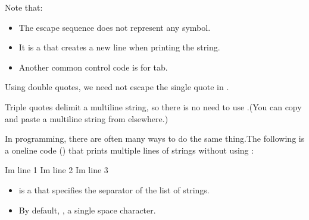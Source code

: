 \documentclass[letterpaper,10pt,english]{sphinxmanual}
\begin{document}
Note that:
\begin{itemize}
\item {} 
The escape sequence  does not represent any symbol.

\item {} 
It is a  that creates a new line when printing the string.

\item {} 
Another common control code is  for tab.

\end{itemize}

Using double quotes, we need not escape the single quote in .

Triple quotes delimit a multi\sphinxhyphen{}line string, so there is no need to use .(You can copy and paste a multi\sphinxhyphen{}line string from elsewhere.)

In programming, there are often many ways to do the same thing.The following is a one\sphinxhyphen{}line code () that prints multiple lines of strings without using :

\begin{sphinxVerbatim}[commandchars=\\\{\}]
     
\end{sphinxVerbatim}

\begin{sphinxVerbatim}[commandchars=\\\{\}]
I\PYGZsq{}m line \PYGZsh{}1
I\PYGZsq{}m line \PYGZsh{}2
I\PYGZsq{}m line \PYGZsh{}3
\end{sphinxVerbatim}
\begin{itemize}
\item {} 
 is a  that specifies the separator of the list of strings.

\item {} 
By default, , a single space character.

\end{itemize}
\end{document}
